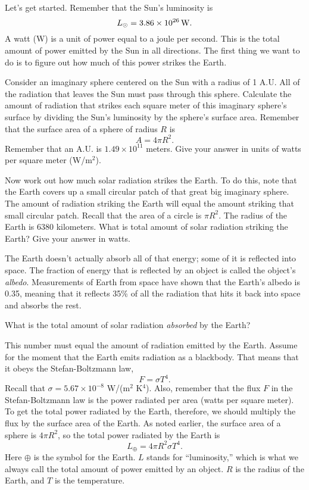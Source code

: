 Let's get started.
Remember that the Sun's luminosity is
$$
L_{\odot}=3.86\times 10^{26}\,{\rm W}.
$$
A watt (W) is a unit of power equal to a joule per second.
This is the total amount of power emitted by the Sun in all directions.
The first thing we want to do is to figure out how much of this
power strikes the Earth.

Consider an imaginary sphere centered on the Sun with a radius
of 1 A.U.  All of the radiation that leaves the Sun must pass through
this sphere.  Calculate the amount of radiation that strikes each square
meter of this imaginary sphere's surface by dividing the Sun's luminosity
by the sphere's surface area.  Remember that the surface area of a sphere
of radius $R$ is
$$
A=4\pi R^2.
$$
Remember that an A.U. is $1.49\times 10^{11}$ meters.
Give your answer in units of watts per square meter (W/m$^2$).

\answerspace{1in}

\pagebreak[4]
Now work out how much solar radiation strikes the Earth.  To do this,
note that the Earth covers up a small circular patch of that great big
imaginary sphere.  The amount of radiation striking the Earth will equal
the amount striking that small circular patch.  Recall that the area
of a circle is $\pi R^2$.  The radius of the Earth is 6380 kilometers.
What is total amount of solar radiation
striking the Earth?  Give your answer in watts.

\answerspace{1.5in}

The Earth doesn't actually absorb all of that energy; some of it
is reflected into space.  The fraction of energy that is reflected
by an object is called the object's {\it albedo}.  Measurements of Earth
from space have shown that the Earth's albedo is 0.35, meaning that it
reflects 35\% of all the radiation that hits it back into space and absorbs
the rest.  

What is the total amount of solar radiation {\it absorbed} by the Earth?

\answerspace{1in}

This number must equal the amount of radiation emitted by the Earth.
Assume for the moment that the Earth emits radiation as a blackbody.
That means that it obeys the Stefan-Boltzmann law,
$$
F=\sigma T^4.
$$
Recall that $\sigma=5.67\times 10^{-8}$ W/(m$^2$ K$^4$).
Also, remember that the flux $F$ in the Stefan-Boltzmann law
is the power radiated per area (watts per square meter).  To get
the total power radiated by the Earth, therefore, we should
multiply the flux by the surface area of the Earth.  As noted
earlier, the surface
area of a sphere is $4\pi R^2$, so the total
power radiated by the Earth
is
$$
L_{\oplus}=4\pi R^2\sigma T^4.
$$
Here $\oplus$ is the symbol for the Earth.  $L$ stands
for ``luminosity,'' which is what we always call the total
amount of power emitted by an object.  $R$ is the radius
of the Earth, and $T$ is the temperature.

